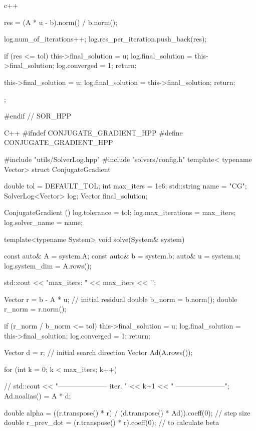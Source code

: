 \begin{codeblock}{c++}
{{{            res = (A * u - b).norm() / b.norm();

            log.num_of_iterations++;
            log.res_per_iteration.push_back(res);

            if (res <= tol) 
            {   
                this->final_solution = u;
                log.final_solution   = this->final_solution;
                log.converged = 1;
                return;
            }
        }
        this->final_solution = u;
        log.final_solution   = this->final_solution;
        return;
    }
};


#endif // SOR_HPP
\end{codeblock}

\begin{codeblock}{C++}
#ifndef CONJUGATE_GRADIENT_HPP
#define CONJUGATE_GRADIENT_HPP

#include "utils/SolverLog.hpp"
#include "solvers/config.h"
template< typename Vector>
struct ConjugateGradient
{
    double              tol       = DEFAULT_TOL;
    int                 max_iters = 1e6;
    std::string         name      = "CG";
    SolverLog<Vector>   log;
    Vector              final_solution;

    ConjugateGradient ()
    {
        log.tolerance      = tol;
        log.max_iterations = max_iters;
        log.solver_name    = name;
    }

    template<typename System>
    void solve(System& system)
    {   
        const auto&  A = system.A;
        const auto&  b = system.b;
        auto&        u = system.u;
        log.system_dim = A.rows();

        std::cout << "max_iters: " << max_iters << '\n';

        Vector r      = b - A * u; // initial residual
        double b_norm = b.norm();
        double r_norm = r.norm();

        if (r_norm / b_norm <= tol) 
        {   
            this->final_solution = u;
            log.final_solution   = this->final_solution;
            log.converged        = 1;
            return;
        }

        Vector d = r; // initial search direction
        Vector Ad(A.rows());

        for (int k = 0; k < max_iters; k++)
        {   
            // std::cout << "--------------------- iter. " << k+1 << " ---------------------\n";
            Ad.noalias() = A * d;

            double alpha      = ((r.transpose() * r) / (d.transpose() * Ad)).coeff(0); // step size
            double r_prev_dot = (r.transpose() * r).coeff(0); // to calculate beta

}}}
\end{codeblock}
